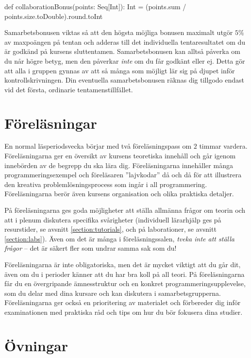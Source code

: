 \begin{Code}
  def collaborationBonus(points: Seq[Int]): Int =
    (points.sum / points.size.toDouble).round.toInt
\end{Code}

Samarbetsbonusen viktas så att den högsta möjliga bonusen maximalt utgör $5\%$ av maxpoängen på tentan och adderas till det individuella tentaresultatet om du är godkänd på kursens sluttentamen. Samarbetsbonusen kan alltså påverka om du når högre betyg, men den påverkar \emph{inte} om du får godkänt eller ej. Detta gör att alla i gruppen gynnas av att så många som möjligt lär sig på djupet inför kontrollskrivningen. Din eventuella samarbetsbonusen räknas dig tillgodo endast vid det första, ordinarie tentamenstillfället.

\section{Föreläsningar}

En normal läsperiodsvecka börjar med två föreläsningspass om $2$ timmar vardera. Föreläsningarna ger en översikt av kursens teoretiska innehåll och går igenom innebörden av de begrepp du ska lära dig. Föreläsningarna innehåller många programmeringsexempel och föreläsaren ''lajvkodar'' då och då för att illustrera den kreativa problemlösningsprocess som ingår i all programmering. Föreläsningarna berör även kursens organisation och olika praktiska detaljer.

På föreläsningarna ges goda möjligheter att ställa allmänna frågor om teorin och att i plenum diskutera specifika svårigheter (individuell lärarhjälp ges på resurstider, se avsnitt \ref{section:tutorials}, och på laborationer, se avsnitt \ref{section:labs}). Även om det är många i föreläsningssalen, \emph{tveka inte att ställa frågor} -- det är säkert fler som undrar samma sak som du!

Föreläsningarna är inte obligatoriska, men det är mycket viktigt att du går dit, även om du i perioder känner att du har bra koll på all teori. På föreläsningarna får du en övergripande ämnesstruktur och en konkret programmeringsupplevelse, som du delar med dina kursare och kan diskutera i samarbetsgrupperna. Föreläsningarna ger också en prioritering av materialet och förbereder dig inför examinationen med praktiska råd och tips om hur du bör fokusera dina studier.

\section{Övningar}

